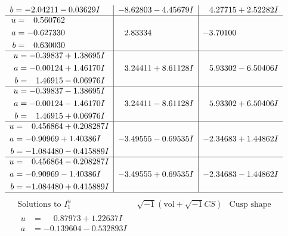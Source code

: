 \documentclass[1p]{elsarticle_modified}
\theoremstyle{definition}
\newcommand{\I}{\sqrt{-1}}
\begin{document}
$$\begin{array}{c|c|c}
\begin{aligned}
b &= -2.04211 - 0.03629 I\end{aligned}
 & -8.62803 - 4.45679 I & \phantom{-}4.27715 + 2.52282 I \\ \hline\begin{aligned}
u &= \phantom{-}0.560762\phantom{ +0.000000I} \\
a &= -0.627330\phantom{ +0.000000I} \\
b &= \phantom{-}0.630030\phantom{ +0.000000I}\end{aligned}
 & \phantom{-}2.83334\phantom{ +0.000000I} & -3.70100\phantom{ +0.000000I} \\ \hline\begin{aligned}
u &= -0.39837 + 1.38695 I \\
a &= -0.00124 + 1.46170 I \\
b &= \phantom{-}1.46915 - 0.06976 I\end{aligned}
 & \phantom{-}3.24411 + 8.61128 I & \phantom{-}5.93302 - 6.50406 I \\ \hline\begin{aligned}
u &= -0.39837 - 1.38695 I \\
a &= -0.00124 - 1.46170 I \\
b &= \phantom{-}1.46915 + 0.06976 I\end{aligned}
 & \phantom{-}3.24411 - 8.61128 I & \phantom{-}5.93302 + 6.50406 I \\ \hline\begin{aligned}
u &= \phantom{-}0.456864 + 0.208287 I \\
a &= -0.90969 + 1.40386 I \\
b &= -1.084480 - 0.415889 I\end{aligned}
 & -3.49555 - 0.69535 I & -2.34683 + 1.44862 I \\ \hline\begin{aligned}
u &= \phantom{-}0.456864 - 0.208287 I \\
a &= -0.90969 - 1.40386 I \\
b &= -1.084480 + 0.415889 I\end{aligned}
 & -3.49555 + 0.69535 I & -2.34683 - 1.44862 I\\
 \hline 
 \end{array}$$\newpage$$\begin{array}{c|c|c}  
\text{Solutions to }I^u_{1}& \I (\text{vol} + \sqrt{-1}CS) & \text{Cusp shape}\\
 \hline 
\begin{aligned}
u &= \phantom{-}0.87973 + 1.22637 I \\
a &= -0.139604 - 0.532893 I \\

\end{aligned}
\end{array}$$
\end{document}
